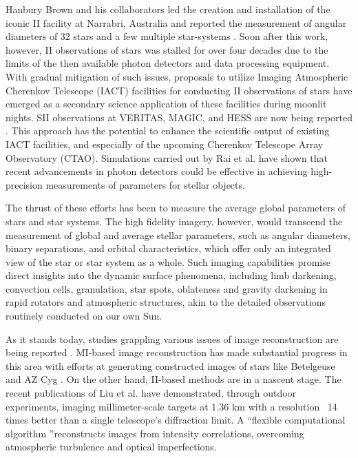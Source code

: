 Hanbury Brown and his collaborators led the creation and installation of the iconic II facility at Narrabri, Australia and reported the measurement of angular diameters of 32 stars and a few multiple star-systems \citep{hanbury1974angular}. Soon after this work, however, II observations of stars was stalled for over four decades due to the limits of the then available photon detectors and data processing equipment. With gradual mitigation of such issues, proposals to utilize Imaging Atmospheric Cherenkov Telescope (IACT) facilities for conducting II observations of stars have emerged\citep{LeBohec2006, nunez2010stellar, nunez2012high, 2013APh....43..331D} as a secondary science application of these facilities during moonlit nights. SII observations at VERITAS, MAGIC, and HESS are now being reported \citep[e.g.,][]{2024ApJ...966...28A,2024MNRAS.529.4387A,2025MNRAS.537.2334V}. This approach has the potential to enhance the scientific output of existing IACT facilities, and especially of the upcoming Cherenkov Telescope Array Observatory (CTAO). Simulations carried out by Rai et al. \citep[e.g.,]{10.1093/mnras/stab2391, 10.1093/mnras/stac2433} have shown that recent advancements in photon detectors could be effective in achieving high-precision measurements of parameters for stellar objects. 

The thrust of these efforts has been to measure the average global parameters of stars and star systems. The high fidelity imagery, however, would transcend the measurement of global and average stellar parameters, such as angular diameters, binary separations, and orbital characteristics, which offer only an integrated view of the star or star system as a whole. Such imaging capabilities promise direct insights into the dynamic surface phenomena, including limb darkening, convection cells, granulation, star spots, oblateness and gravity darkening in rapid rotators and atmospheric structures, akin to the detailed observations routinely conducted on our own Sun.

As it stands today, studies grappling various issues of image reconstruction are being reported \citep{Haubois2009, Norris2021AZCyg, Liu2024SuperresolutionII, Liu2025}. MI-based image reconstruction has made substantial progress in this area with efforts at generating constructed images of stars like Betelgeuse \citep{Haubois2009} and AZ Cyg \citep{Norris2021AZCyg}. On the other hand, II-based methods are in a nascent stage. The recent publications of Liu et al. \cite{Liu2024SuperresolutionII, Liu2025} have demonstrated, through outdoor experiments, imaging millimeter-scale targets at 1.36 km with a resolution ~14 times better than a single telescope’s diffraction limit. A \textquotedblleft flexible computational algorithm \textquotedblright reconstructs images from intensity correlations, overcoming atmospheric turbulence and optical imperfections. 

